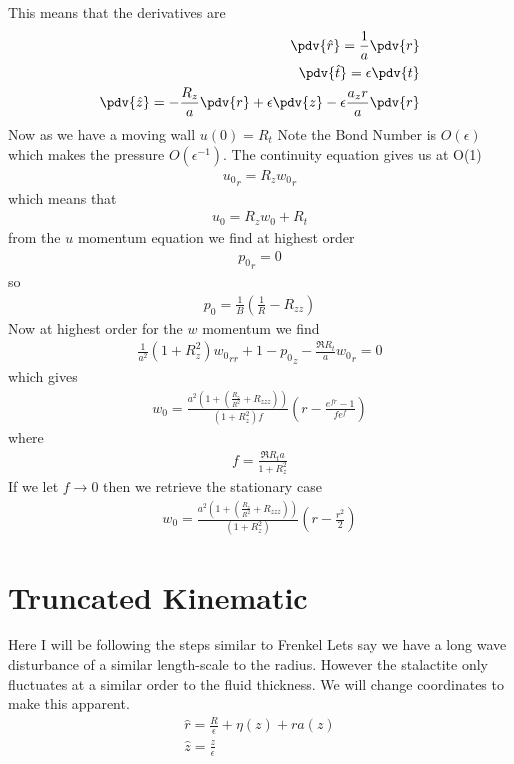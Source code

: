 \documentclass[12pt]{article}
\begin{document}
This means that the derivatives are 
\begin{align}
\pdv{\hat{r}} = \frac{1}{a}\pdv{r}\\
\pdv{\hat{t}} = \epsilon\pdv{t}\\
\pdv{\hat{z}} = -\frac{R_z}{a}\pdv{r} +\epsilon \pdv{z} - \epsilon\frac{a_z r}{a}\pdv{r}
	\end{align}
Now as we have a moving wall $u(0) = R_t$
Note the Bond Number is $O(\epsilon)$ which makes the pressure $O(\epsilon^{-1})$.
The continuity equation gives us at O(1) 
\begin{align}
{u_0}_r = R_z {w_0}_r
\end{align}
which means that 
\begin{align}
u_0 = R_z w_0 + R_t 
\end{align}
from the $u$ momentum equation we find at highest order 
\begin{align}
{p_0}_r = 0 
\end{align}
so 
\begin{align}
p_0 =\frac{1}{B}\left(\frac{1}{R} - R_{zz}\right)
\end{align} 
Now at highest order for the $w$ momentum we find
\begin{align}
\frac{1}{a^2}(1+ R_z^2) {w_0}_{rr} + 1 - {p_0}_z- \frac{\Re R_t}{a}{w_0}_{r} = 0 
\end{align}
which gives
\begin{align}
w_0 = \frac{a^2 ( 1 + \left(\frac{R_z}{R^2}+R_{zzz}\right))}{(1+R_z^2)f}\left(r - \frac{e^{fr}-1}{fe^f}\right)
\end{align}
where
\begin{align}
f = \frac{\Re R_t a}{1+R_z^2}
\end{align}
If we let $f\to 0$ then we retrieve the stationary case
\begin{align}
w_0 =\frac{a^2 ( 1 + \left(\frac{R_z}{R^2}+R_{zzz}\right))}{(1+R_z^2)}\left(r -\frac{r^2}{2}\right)
\end{align}
\section{Truncated Kinematic}
Here I will be following the steps similar to Frenkel \cite{frenkel1993evolution}
Lets say we have a long wave disturbance of a similar length-scale to the radius. However the stalactite only fluctuates at a similar order to the fluid thickness. We will change coordinates to make this apparent.
\begin{align}
\hat r = \frac{R}{\epsilon} + \eta(z) + r a(z)\\\hat z =\frac{z}{\epsilon}
\end{align}
\end{document}
